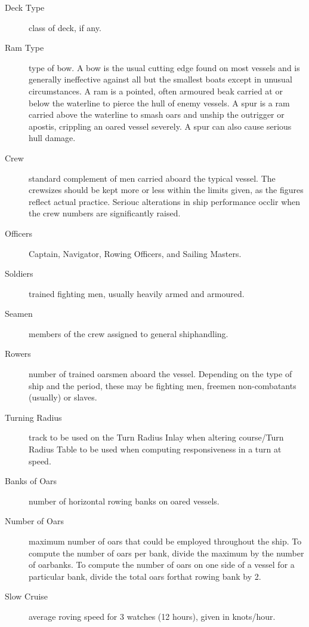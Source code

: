 \documentclass{article}
\begin{document}
\begin{description}
\item[Deck Type] class of deck, if any.

\item[Ram Type] type of bow. A bow is the usual cutting edge found on
  most vessels and is generally ineffective against all but the
  smallest boats except in unusual circumstances. A ram is a pointed,
  often armoured beak carried at or below the waterline to pierce the
  hull of enemy vessels.  A spur is a ram carried above the waterline
  to smash oars and unship the outrigger or apostis, crippling an
  oared vessel severely.  A spur can also cause serious hull damage.


\item[Crew] standard complement of men carried aboard the typical
  vessel.  The crewsizes should be kept more or less within the limits
  given, as the figures reflect actual practice.  Seriouc alterations
  in ship performance occlir when the crew numbers are significantly
  raised.

\item[Officers] Captain, Navigator, Rowing Officers, and Sailing
  Masters.

\item[Soldiers] trained fighting men, usually heavily armed and
  armoured.

\item[Seamen] members of the crew assigned to general shiphandling.

\item[Rowers] number of trained oarsmen aboard the vessel.  Depending
  on the type of ship and the period, these may be fighting men,
  freemen non-combatants (usually) or slaves.

\item[Turning Radius] track to be used on the Turn Radius Inlay when
  altering course/Turn Radius Table to be used when computing
  responsiveness in a turn at speed.

\item[Banks of Oars] number of horizontal rowing banks on oared
  vessels.

\item[Number of Oars] maximum number of oars that could be employed
  throughout the ship.  To compute the number of oars per bank, divide
  the maximum by the number of oarbanks.  To compute the number of
  oars on one side of a vessel for a particular bank, divide the total
  oars forthat rowing bank by 2.


\item[Slow Cruise] average roving speed for 3 watches (12 hours),
  given in knots/hour.


\end{description}
\end{document}

